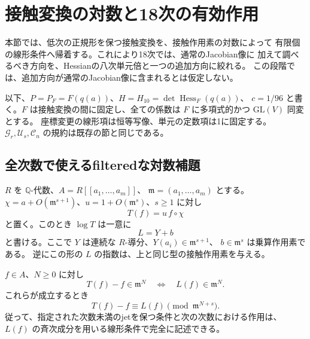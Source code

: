 


\section{接触変換の対数と18次の有効作用}
\label{sec:v14-log-contact}

本節では、低次の正規形を保つ接触変換を、接触作用素の対数によって
有限個の線形条件へ帰着する。これにより18次では、通常のJacobian像に
加えて調べるべき方向を、Hessianの八次単元倍と一つの追加方向に絞れる。
この段階では、追加方向が通常のJacobian像に含まれるとは仮定しない。

以下、$P=P_F=F(q(a))$、$H=H_{10}=\det\operatorname{Hess}_F(q(a))$、
$c=1/96$ と書く。$F$ は接触変換の間に固定し、全ての係数は
$F$ に多項式的かつ $\mathrm{GL}(V)$ 同変とする。
座標変更の線形項は恒等写像、単元の定数項は1に固定する。
$\mathcal G_r,\mathcal U_s,\mathcal C_n$ の規約は既存の節と同じである。

\subsection{全次数で使えるfilteredな対数補題}

\begin{lemma}[接触作用素の対数]
\label{lem:v14-contact-logarithm}
$R$ を $\mathbb Q$-代数、$A=R[[a_1,\ldots,a_m]]$、
$\mathfrak m=(a_1,\ldots,a_m)$ とする。
$\chi=a+O(\mathfrak m^{s+1})$、$u=1+O(\mathfrak m^s)$、$s\ge1$ に対し
\[
 T(f)=u\,f\circ\chi
\]
と置く。このとき $\log T$ は一意に
\[
 L=Y+b
\]
と書ける。ここで $Y$ は連続な $R$-導分、$Y(a_i)\in\mathfrak m^{s+1}$、
$b\in\mathfrak m^s$ は乗算作用素である。
逆にこの形の $L$ の指数は、上と同じ型の接触作用素を与える。

$f\in A$、$N\ge0$ に対し
\[
 T(f)-f\in\mathfrak m^N\quad\Longleftrightarrow\quad
 L(f)\in\mathfrak m^N.
\]
これらが成立するとき
\[
 T(f)-f\equiv L(f)\pmod{\mathfrak m^{N+s}}.
\]
従って、指定された次数未満のjetを保つ条件と次の次数における作用は、
$L(f)$ の斉次成分を用いる線形条件で完全に記述できる。
\end{lemma}

